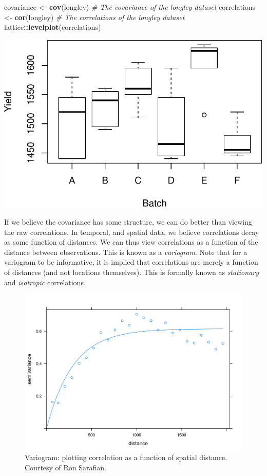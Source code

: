 \documentclass[]{book}
\newenvironment{Shaded}{\begin{snugshade}}{\end{snugshade}}
\newcommand{\CommentTok}[1]{\textcolor[rgb]{0.56,0.35,0.01}{\textit{#1}}}
\newcommand{\KeywordTok}[1]{\textcolor[rgb]{0.13,0.29,0.53}{\textbf{#1}}}
\newcommand{\NormalTok}[1]{#1}
\newcommand{\OperatorTok}[1]{\textcolor[rgb]{0.81,0.36,0.00}{\textbf{#1}}}
\newcommand{\StringTok}[1]{\textcolor[rgb]{0.31,0.60,0.02}{#1}}
\theoremstyle{definition}
\theoremstyle{definition}
\theoremstyle{definition}
\theoremstyle{remark}
\begin{document}
\begin{Shaded}
\begin{Highlighting}[]
\NormalTok{covariance <-}\StringTok{ }\KeywordTok{cov}\NormalTok{(longley) }\CommentTok{# The covariance of the longley dataset}
\NormalTok{correlations <-}\StringTok{ }\KeywordTok{cor}\NormalTok{(longley) }\CommentTok{# The correlations of the longley dataset}
\NormalTok{lattice}\OperatorTok{::}\KeywordTok{levelplot}\NormalTok{(correlations)}
\end{Highlighting}
\end{Shaded}

\includegraphics[width=0.5\linewidth]{Rcourse_files/figure-latex/unnamed-chunk-142-1}

If we believe the covariance has some structure, we can do better than viewing the raw correlations.
In temporal, and spatial data, we believe correlations decay as some function of distances.
We can thus view correlations as a function of the distance between observations. This is known as a \emph{variogram}.
Note that for a variogram to be informative, it is implied that correlations are merely a function of distances (and not locations themselves).
This is formally known as \emph{stationary} and \emph{isotropic} correlations.

\begin{figure}
\centering
\includegraphics{art/variogram.png}
\caption{Variogram: plotting correlation as a function of spatial distance. Courtesy of Ron Sarafian.}
\end{figure}
\end{document}
